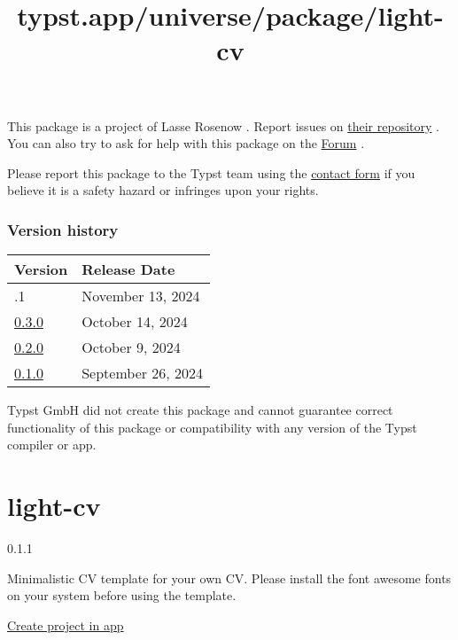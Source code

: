 This package is a project of Lasse Rosenow . Report issues on
\href{https://github.com/LasseRosenow/HAW-Hamburg-Typst-Template}{their
repository} . You can also try to ask for help with this package on the
\href{https://forum.typst.app}{Forum} .

Please report this package to the Typst team using the
\href{https://typst.app/contact}{contact form} if you believe it is a
safety hazard or infringes upon your rights.

\label{versions}
\subsubsection{Version history}\label{version-history}

\begin{longtable}[]{@{}ll@{}}
\toprule\noalign{}
Version & Release Date \\
\midrule\noalign{}
\endhead
\bottomrule\noalign{}
\endlastfoot
0.3.1 & November 13, 2024 \\
\href{https://typst.app/universe/package/haw-hamburg/0.3.0/}{0.3.0} &
October 14, 2024 \\
\href{https://typst.app/universe/package/haw-hamburg/0.2.0/}{0.2.0} &
October 9, 2024 \\
\href{https://typst.app/universe/package/haw-hamburg/0.1.0/}{0.1.0} &
September 26, 2024 \\
\end{longtable}

Typst GmbH did not create this package and cannot guarantee correct
functionality of this package or compatibility with any version of the
Typst compiler or app.


\title{typst.app/universe/package/light-cv}

\label{banner}
\label{template-thumbnail}

\section{light-cv}\label{light-cv}

{ 0.1.1 }

Minimalistic CV template for your own CV. Please install the font
awesome fonts on your system before using the template.

\href{/app?template=light-cv&version=0.1.1}{Create project in app}

